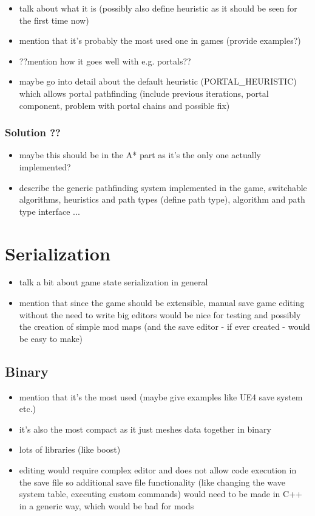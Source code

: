 \begin{itemize}
	\item talk about what it is (possibly also define heuristic as it should
		be seen for the first time now)
	\item mention that it's probably the most used one in games (provide examples?)
	\item ??mention how it goes well with e.g. portals??
	\item maybe go into detail about the default heuristic (PORTAL\_HEURISTIC) which
		allows portal pathfinding (include previous iterations, portal component,
		problem with portal chains and possible fix)
\end{itemize}

\subsubsection{Solution ??}

\begin{itemize}
    \item maybe this should be in the A* part as it's the only one actually implemented?
    \item describe the generic pathfinding system implemented in the game, switchable
	    algorithms, heuristics and path types (define path type),
	    algorithm and path type interface ...
\end{itemize}

\section{Serialization}

\begin{itemize}
    \item talk a bit about game state serialization in general
    \item mention that since the game should be extensible, manual save game
	    editing without the need to write big editors would be nice
	    for testing and possibly the creation of simple mod maps
	    (and the save editor - if ever created - would be easy to make)
\end{itemize}

\subsection{Binary}

\begin{itemize}
    \item mention that it's the most used
	    (maybe give examples like UE4 save system etc.)
    \item it's also the most compact as it just meshes data together in binary
    \item lots of libraries (like boost)
    \item editing would require complex editor and does not allow code execution in the
	    save file so additional save file functionality (like changing the wave
	    system table, executing custom commands) would need to be made in C++
	    in a generic way, which would be bad for mods
\end{itemize}

